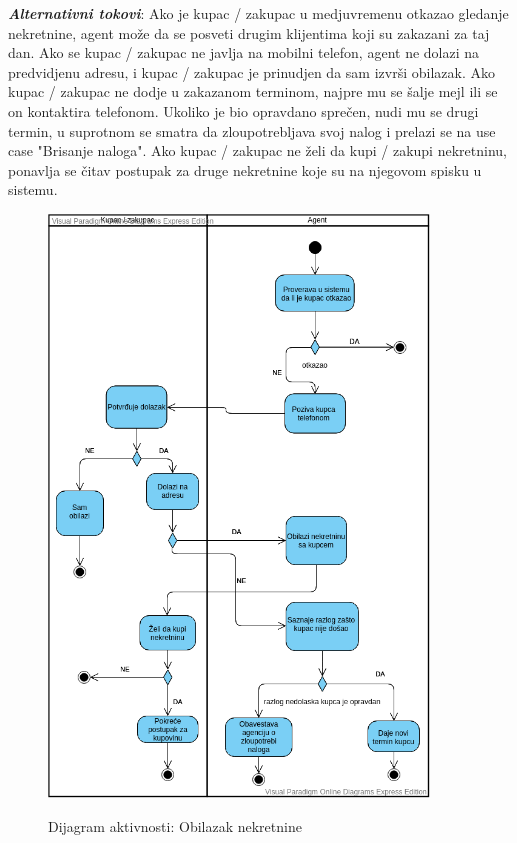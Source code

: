 \documentclass[20pt]{article}
\begin{document}
\textbf{\textit{Alternativni tokovi}}: Ako je kupac / zakupac u medjuvremenu otkazao gledanje nekretnine, agent mo\v ze da se posveti drugim klijentima koji su zakazani za taj dan. Ako se kupac / zakupac ne javlja na mobilni telefon, agent ne dolazi na predvidjenu adresu, i kupac / zakupac je prinudjen da sam izvr\v si obilazak. Ako kupac / zakupac ne dodje u zakazanom terminom, najpre mu se \v salje mejl ili se on kontaktira telefonom. Ukoliko je bio opravdano spre\v cen, nudi mu se drugi termin, u suprotnom se smatra da zloupotrebljava svoj nalog i prelazi se na use case "Brisanje naloga". Ako kupac / zakupac ne \v zeli da kupi / zakupi nekretninu, ponavlja se \v citav postupak za druge nekretnine koje su na njegovom spisku u sistemu.  \\
 
\newpage
\begin{figure}[h]
		\centering
		\includegraphics[width=0.9\textwidth,height=0.74\textheight]{Pictures/DijagramAktivnostiObilazakNekretnine.png}\\
		\caption{Dijagram aktivnosti: Obilazak nekretnine}
		\label{fig:dijagramAktivnostiObilazakNekretnine}
	\end{figure}
\newpage
\end{document}
